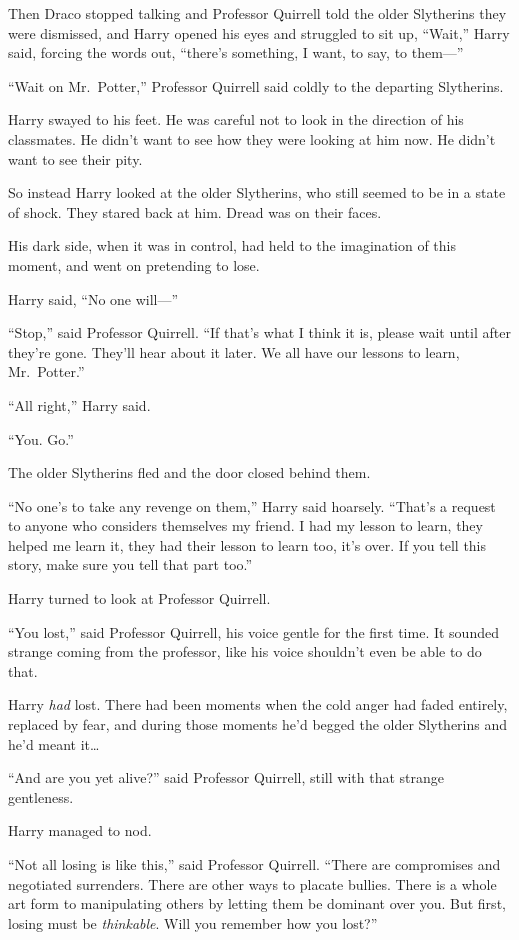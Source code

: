 Then Draco stopped talking and Professor Quirrell told the older
Slytherins they were dismissed, and Harry opened his eyes and struggled
to sit up, ``Wait,'' Harry said, forcing the words out, ``there's
something, I want, to say, to them---''

``Wait on Mr.~Potter,'' Professor Quirrell said coldly to the departing
Slytherins.

Harry swayed to his feet. He was careful not to look in the direction of
his classmates. He didn't want to see how they were looking at him now.
He didn't want to see their pity.

So instead Harry looked at the older Slytherins, who still seemed to be
in a state of shock. They stared back at him. Dread was on their faces.

His dark side, when it was in control, had held to the imagination of
this moment, and went on pretending to lose.

Harry said, ``No one will---''

``Stop,'' said Professor Quirrell. ``If that's what I think it is,
please wait until after they're gone. They'll hear about it later. We
all have our lessons to learn, Mr.~Potter.''

``All right,'' Harry said.

``You. Go.''

The older Slytherins fled and the door closed behind them.

``No one's to take any revenge on them,'' Harry said hoarsely. ``That's
a request to anyone who considers themselves my friend. I had my lesson
to learn, they helped me learn it, they had their lesson to learn too,
it's over. If you tell this story, make sure you tell that part too.''

Harry turned to look at Professor Quirrell.

``You lost,'' said Professor Quirrell, his voice gentle for the first
time. It sounded strange coming from the professor, like his voice
shouldn't even be able to do that.

Harry \emph{had} lost. There had been moments when the cold anger had
faded entirely, replaced by fear, and during those moments he'd begged
the older Slytherins and he'd meant it\ldots{}

``And are you yet alive?'' said Professor Quirrell, still with that
strange gentleness.

Harry managed to nod.

``Not all losing is like this,'' said Professor Quirrell. ``There are
compromises and negotiated surrenders. There are other ways to placate
bullies. There is a whole art form to manipulating others by letting
them be dominant over you. But first, losing must be \emph{thinkable}.
Will you remember how you lost?''

